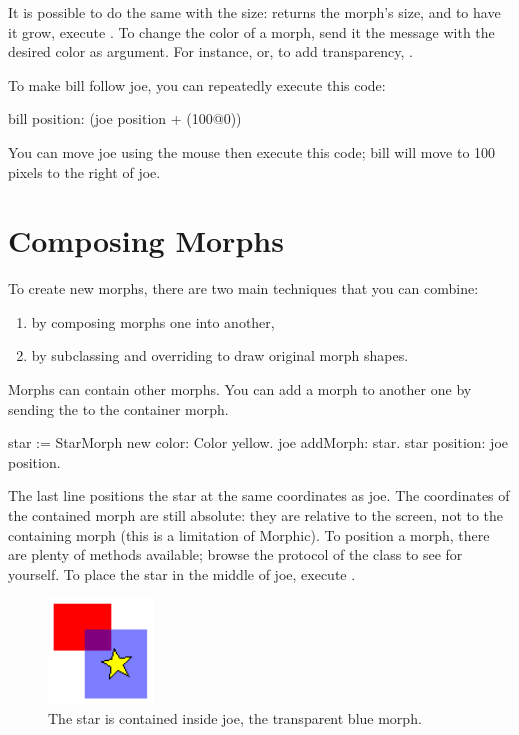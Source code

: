 \documentclass[a4paper,10pt,twoside]{book}
\begin{document}
It is possible to do the same with the size:   returns the morph's size, and to have it grow, execute .
To change the color of a morph, send it the  message with the desired color as argument. For instance,  or, to add transparency, .

To make bill follow joe, you can repeatedly execute this code:
\begin{code}{}
bill position: (joe position + (100@0))
\end{code}
\noindent
You can move joe using the mouse then execute this code; bill will move to 100 pixels to the right of joe.

\section{Composing Morphs}

To create new morphs, there are two main techniques that you can combine:
\begin{enumerate}
	\item by composing morphs one into another,
	\item by subclassing  and overriding  to draw original morph shapes.
\end{enumerate}

Morphs can contain other morphs. You can add a morph to another one by sending the  to the container morph.

\begin{code}{}
star := StarMorph new color: Color yellow.
joe addMorph: star.
star position: joe position.
\end{code}
\noindent
The last line positions the star at the same coordinates as joe.
The coordinates of the contained morph are still absolute: they are relative to the screen, not to the containing morph (this is a limitation of Morphic).
To position a morph, there are plenty of methods available; browse the  protocol of the  class to see for yourself.
To place the star in the middle of joe, execute   .

\begin{figure}[ht]
	\centerline{\includegraphics{joeStar}}
	\caption{The star is contained inside joe, the transparent blue morph.
		\label{fig:joeStar}}
\end{figure}
\end{document}
